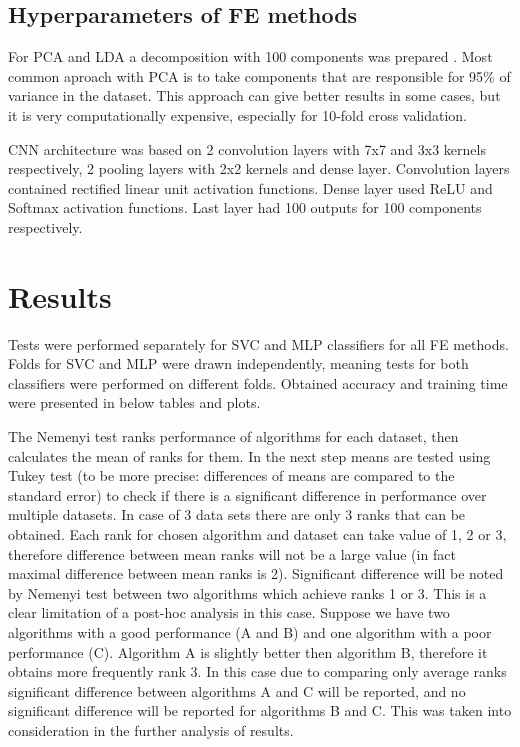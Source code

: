 \documentclass[a4paper, 10 pt, journal]{ieeeconf}
\begin{document}
\subsection{Hyperparameters of FE methods}

For PCA and LDA a decomposition with 100 components was prepared . Most common aproach with PCA is to take components that are responsible for 95\% of variance in the dataset. This approach can give better results in some cases, but it is very computationally expensive, especially for 10-fold cross validation. 

CNN architecture was based on 2 convolution layers with 7x7 and 3x3 kernels respectively, 2 pooling layers with 2x2 kernels and dense layer. Convolution layers contained rectified linear unit  activation functions. Dense layer used ReLU and Softmax activation functions. Last layer had 100 outputs for 100 components respectively.


\section{Results}

Tests were performed separately for SVC and MLP classifiers for all FE methods. Folds for SVC and MLP were drawn independently, meaning tests for both classifiers were performed on different folds. Obtained accuracy and training time were presented in below tables and plots.

The Nemenyi test ranks performance of algorithms for each dataset, then calculates the mean of ranks for them. In the next step means are tested using Tukey test (to be more precise: differences of means are compared to the standard error) to check if there is a significant difference in performance over multiple datasets. In case of 3 data sets there are only 3 ranks that can be obtained. Each rank for chosen algorithm and dataset can take value of 1, 2 or 3, therefore difference between mean ranks will not be a large value (in fact maximal difference between mean ranks is 2). Significant difference will be noted by Nemenyi test between two algorithms which achieve ranks 1 or 3. This is a clear limitation of a post-hoc analysis in this case. Suppose we have two algorithms with a good performance (A and B) and one algorithm with a poor performance (C). Algorithm A is slightly better then algorithm B, therefore it obtains more frequently rank 3. In this case due to comparing only average ranks significant difference between algorithms A and C will be reported, and no significant difference will be reported for algorithms B and C. This was taken into consideration in the further analysis of results.
\end{document}
